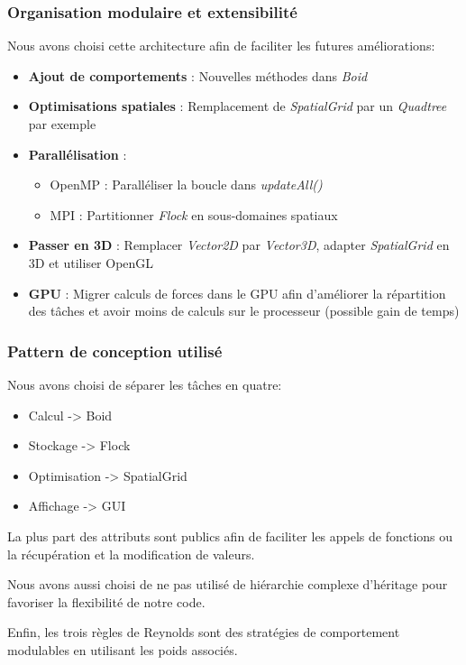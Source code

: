 \documentclass[11pt,a4paper]{article}
\begin{document}
\subsubsection{Organisation modulaire et extensibilité}
Nous avons choisi cette architecture afin de faciliter les futures améliorations:
\begin{itemize}
    \item \textbf{Ajout de comportements} : Nouvelles méthodes dans \textit{Boid}
    \item \textbf{Optimisations spatiales} : Remplacement de \textit{SpatialGrid} par un \textit{Quadtree} par exemple
    \item \textbf{Parallélisation} :
    \begin{itemize}
        \item OpenMP : Paralléliser la boucle dans \textit{updateAll()}
        \item MPI : Partitionner \textit{Flock} en sous-domaines spatiaux 
    \end{itemize}
    \item \textbf{Passer en 3D} : Remplacer \textit{Vector2D} par \textit{Vector3D}, adapter \textit{SpatialGrid} en 3D et utiliser OpenGL
    \item \textbf{GPU} : Migrer calculs de forces dans le GPU afin d'améliorer la répartition des tâches et avoir moins de calculs sur le processeur (possible gain de temps)
\end{itemize}

\subsubsection{Pattern de conception utilisé}
Nous avons choisi de séparer les tâches en quatre:
\begin{itemize}
    \item Calcul -> Boid
    \item Stockage -> Flock
    \item Optimisation -> SpatialGrid
    \item Affichage -> GUI
\end{itemize}

La plus part des attributs sont publics afin de faciliter les appels de fonctions ou la récupération et la modification de valeurs.

Nous avons aussi choisi de ne pas utilisé de hiérarchie complexe d'héritage pour favoriser la flexibilité de notre code.

Enfin, les trois règles de Reynolds sont des stratégies de comportement modulables en utilisant les poids associés.
\end{document}
